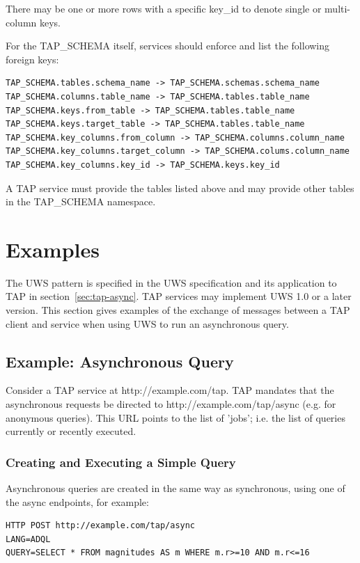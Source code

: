 \documentclass[11pt,letter]{ivoa}
\newcommand{\tapschema}{TAP\_SCHEMA}
\newcommand{\tapschema}{{%
  \relsize{-0.5}TAP\discretionary{-}{}{\kern-2pt\_}SCHEMA}}
\begin{document}
There may be one or more rows with a specific key\_id to 
denote single or multi-column keys.

For the \tapschema{} itself, services should enforce and list the following foreign keys:

\begin{verbatim}
TAP_SCHEMA.tables.schema_name -> TAP_SCHEMA.schemas.schema_name
TAP_SCHEMA.columns.table_name -> TAP_SCHEMA.tables.table_name
TAP_SCHEMA.keys.from_table -> TAP_SCHEMA.tables.table_name
TAP_SCHEMA.keys.target_table -> TAP_SCHEMA.tables.table_name
TAP_SCHEMA.key_columns.from_column -> TAP_SCHEMA.columns.column_name
TAP_SCHEMA.key_columns.target_column -> TAP_SCHEMA.colums.column_name
TAP_SCHEMA.key_columns.key_id -> TAP_SCHEMA.keys.key_id
\end{verbatim}

A TAP service must provide the tables listed above and may provide other tables 
in the \tapschema{} namespace.


\section{Examples}
\label{sec:examples}

The UWS pattern is specified in the UWS specification \citep{std:UWS} and its application to TAP in 
section~\ref{sec:tap-async}. TAP services may implement UWS 1.0
or a later version. 
This section gives examples of the exchange of messages between a 
TAP client and service when using UWS to run an asynchronous query.

\subsection{Example: Asynchronous Query}
Consider a TAP service at http://example.com/tap. TAP mandates that the 
asynchronous requests be directed to http://example.com/tap/async (e.g. for 
anonymous queries). This URL points to the list of 'jobs'; i.e. the list of 
queries currently or recently executed.

\subsubsection{Creating and Executing a Simple Query}

Asynchronous queries are created in the same way as synchronous, using 
one of the {async} endpoints, for example:

\begin{verbatim}
HTTP POST http://example.com/tap/async
LANG=ADQL
QUERY=SELECT * FROM magnitudes AS m WHERE m.r>=10 AND m.r<=16
\end{verbatim}
\end{document}
